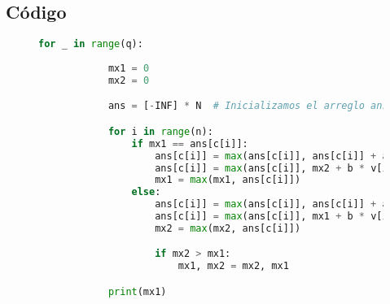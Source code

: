 \documentclass{article}
\begin{document}
\subsection{Código}

\begin{figure}[H]
    \centering
    \begin{lstlisting}[language=Python]
        for _ in range(q):
    
            mx1 = 0
            mx2 = 0

            ans = [-INF] * N  # Inicializamos el arreglo ans con -INF

            for i in range(n):
                if mx1 == ans[c[i]]:
                    ans[c[i]] = max(ans[c[i]], ans[c[i]] + a * v[i])
                    ans[c[i]] = max(ans[c[i]], mx2 + b * v[i])
                    mx1 = max(mx1, ans[c[i]])
                else:
                    ans[c[i]] = max(ans[c[i]], ans[c[i]] + a * v[i])
                    ans[c[i]] = max(ans[c[i]], mx1 + b * v[i])
                    mx2 = max(mx2, ans[c[i]])

                    if mx2 > mx1:
                        mx1, mx2 = mx2, mx1

            print(mx1)
    \end{lstlisting}
\end{figure}
 
\end{document}
